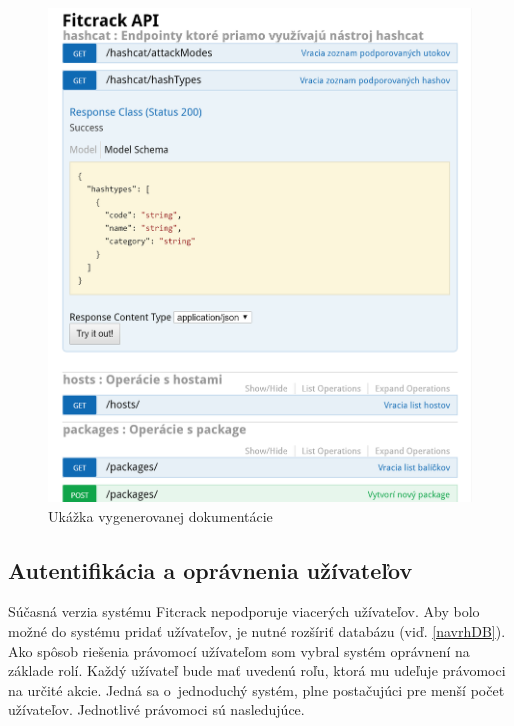 \documentclass[slovak]{fitthesis}
\begin{document}
\begin{figure}[H]
    \centering
    \includegraphics[scale=0.45]{obrazky/doc.PNG}
    \caption{Ukážka vygenerovanej dokumentácie}
    \label{fig:doc}
\end{figure}

\subsection{Autentifikácia a oprávnenia užívateľov}
Súčasná verzia systému Fitcrack nepodporuje viacerých užívateľov. Aby bolo možné do systému pridať užívateľov, je nutné rozšíriť databázu (viď. \ref{navrhDB}). Ako spôsob riešenia právomocí užívateľom som vybral systém oprávnení na základe rolí. Každý užívateľ bude mať uvedenú roľu, ktorá mu udeľuje právomoci na určité akcie. Jedná sa o~jednoduchý systém, plne postačujúci pre menší počet užívateľov. Jednotlivé právomoci sú nasledujúce.
\end{document}
